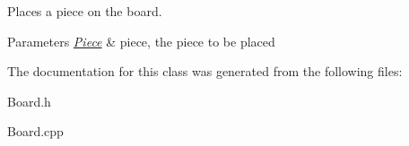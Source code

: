 Places a piece on the board. 


\begin{DoxyParams}{Parameters}
{\em \hyperlink{class_piece}{Piece}} & piece, the piece to be placed \\
\hline
\end{DoxyParams}


The documentation for this class was generated from the following files\+:\begin{DoxyCompactItemize}
\item 
Board.\+h\item 
Board.\+cpp\end{DoxyCompactItemize}
